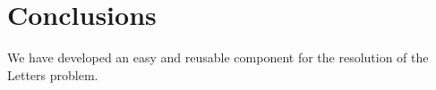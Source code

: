 \documentclass[a4paper,10pt,titlepage]{article}
\begin{document}
\section{Conclusions}

\par We have developed an easy and reusable component for the resolution of the Letters problem. 
\end{document}
